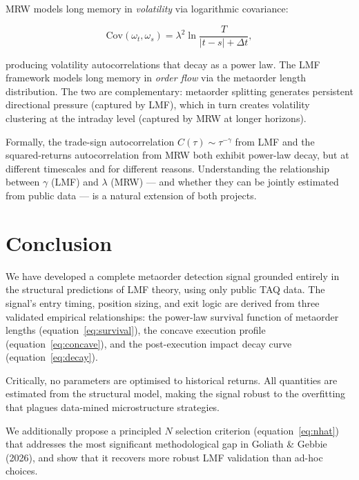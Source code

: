 \documentclass[12pt,a4paper]{article}
\begin{document}
MRW models long memory in \emph{volatility} via logarithmic covariance:

\begin{equation}
  \text{Cov}(\omega_t, \omega_s) = \lambda^2 \ln \frac{T}{|t - s| + \Delta t},
  \label{eq:mrw_cov}
\end{equation}

\noindent producing volatility autocorrelations that decay as a power law.
The LMF framework models long memory in \emph{order flow} via the metaorder
length distribution. The two are complementary: metaorder splitting generates
persistent directional pressure (captured by LMF), which in turn creates
volatility clustering at the intraday level (captured by MRW at longer horizons).

Formally, the trade-sign autocorrelation $C(\tau) \sim \tau^{-\gamma}$ from
LMF and the squared-returns autocorrelation from MRW both exhibit power-law
decay, but at different timescales and for different reasons. Understanding the
relationship between $\gamma$ (LMF) and $\lambda$ (MRW) --- and whether they
can be jointly estimated from public data --- is a natural extension of both
projects.

\section{Conclusion}
\label{sec:conclusion}

We have developed a complete metaorder detection signal grounded entirely in the
structural predictions of LMF theory, using only public TAQ data. The signal's
entry timing, position sizing, and exit logic are derived from three validated
empirical relationships: the power-law survival function of metaorder lengths
(equation~\eqref{eq:survival}), the concave execution profile
(equation~\eqref{eq:concave}), and the post-execution impact decay curve
(equation~\eqref{eq:decay}).

Critically, no parameters are optimised to historical returns. All quantities
are estimated from the structural model, making the signal robust to the
overfitting that plagues data-mined microstructure strategies.

We additionally propose a principled $N$ selection criterion
(equation~\eqref{eq:nhat}) that addresses the most significant methodological
gap in Goliath \& Gebbie (2026), and show that it recovers more robust LMF
validation than ad-hoc choices.
\end{document}
